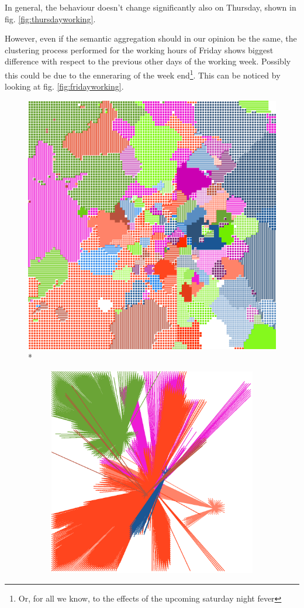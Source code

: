 \documentclass[12pt,a4paper]{article}
\begin{document}
In general, the behaviour doesn't change significantly also on Thursday, shown in fig. \ref{fig:thursdayworking}.

However, even if the semantic aggregation should in our opinion be the same, the clustering process performed for the working hours of Friday shows biggest difference with respect to the previous other days of the working week. Possibly this could be due to the enneraring of the week end\footnote{Or, for all we know, to the effects of the upcoming saturday night fever}. This can be noticed by looking at fig. \ref{fig:fridayworking}.

\begin{figure}[H]
\centering
\includegraphics[width=0.8\linewidth]{weekDef/4Thu.png}
\\*
\begin{subfigure}[b]{0.3\textwidth}
\includegraphics[width=\textwidth]{weekDef/edges-4Thu-big.png}

\end{subfigure}
\end{figure}
\end{document}
